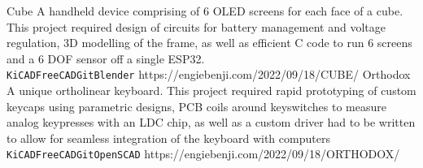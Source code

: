 \documentclass[9pt]{developercv} %
\begin{document}

	\begin{entrylist}
		\QRentry
			{Cube}
			{A handheld device comprising of 6 OLED screens for each face of a cube. This project required design of circuits for battery management and voltage regulation, 3D modelling of the frame, as well as efficient C code to run 6 screens and a 6 DOF sensor off a single ESP32.\\ \texttt{KiCAD}\slashsep\texttt{FreeCAD}\slashsep\texttt{Git}\slashsep\texttt{Blender}}
			{https://engiebenji.com/2022/09/18/CUBE/}
		\QRentry
			{Orthodox}
			{A unique ortholinear keyboard. This project required rapid prototyping of custom keycaps using parametric designs, PCB coils around keyswitches to measure analog keypresses with an LDC chip, as well as a custom driver had to be written to allow for seamless integration of the keyboard with computers \\\texttt{KiCAD}\slashsep\texttt{FreeCAD}\slashsep\texttt{Git}\slashsep\texttt{OpenSCAD}}
			{https://engiebenji.com/2022/09/18/ORTHODOX/}
	\end{entrylist}


\end{document}

